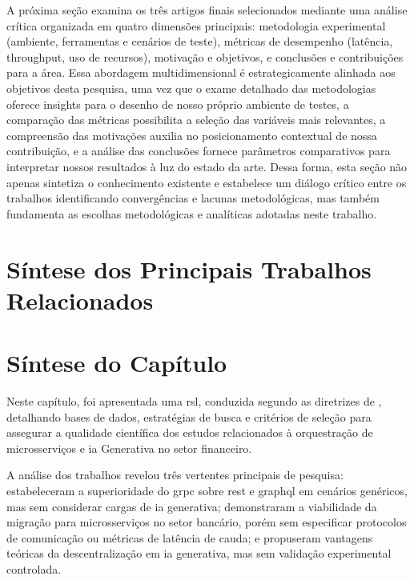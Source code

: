 A próxima seção examina os três artigos finais selecionados mediante uma análise crítica organizada em quatro dimensões principais: metodologia experimental (ambiente, ferramentas e cenários de teste), métricas de desempenho (latência, throughput, uso de recursos), motivação e objetivos, e conclusões e contribuições para a área. Essa abordagem multidimensional é estrategicamente alinhada aos objetivos desta pesquisa, uma vez que o exame detalhado das metodologias oferece insights para o desenho de nosso próprio ambiente de testes, a comparação das métricas possibilita a seleção das variáveis mais relevantes, a compreensão das motivações auxilia no posicionamento contextual de nossa contribuição, e a análise das conclusões fornece parâmetros comparativos para interpretar nossos resultados à luz do estado da arte. Dessa forma, esta seção não apenas sintetiza o conhecimento existente e estabelece um diálogo crítico entre os trabalhos identificando convergências e lacunas metodológicas, mas também fundamenta as escolhas metodológicas e analíticas adotadas neste trabalho.

\section{Síntese dos Principais Trabalhos Relacionados}
\label{sec:3-sintese-trabalhos}

\vspace{\fill}



\section{Síntese do Capítulo}
\label{sec:sintese_capitulo}

Neste capítulo, foi apresentada uma \acrfull{rsl}, conduzida segundo as diretrizes de \cite{scannavino_revisao_2017}, detalhando bases de dados, estratégias de busca e critérios de seleção para assegurar a qualidade científica dos estudos relacionados à orquestração de microsserviços e \gls{ia} Generativa no setor financeiro.

A análise dos trabalhos revelou três vertentes principais de pesquisa: \textcite{niswar_performance_2024} estabeleceram a superioridade do \gls{grpc} sobre \gls{rest} e \acrshort{graphql} em cenários genéricos, mas sem considerar cargas de \gls{ia} generativa; \textcite{maulana_design_2022} demonstraram a viabilidade da migração para microsserviços no setor bancário, porém sem especificar protocolos de comunicação ou métricas de latência de cauda; e \textcite{jhingran_decentralized_2024} propuseram vantagens teóricas da descentralização em \gls{ia} generativa, mas sem validação experimental controlada.

